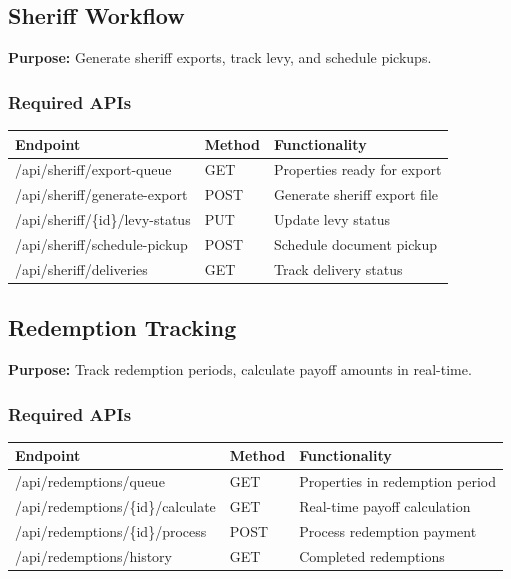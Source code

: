 \documentclass[11pt,a4paper]{article}
\begin{document}
\subsection{Sheriff Workflow}

\textbf{Purpose:} Generate sheriff exports, track levy, and schedule pickups.

\subsubsection{Required APIs}

\begin{longtable}{|p{5cm}|p{2cm}|p{6cm}|}
\hline
\textbf{Endpoint} & \textbf{Method} & \textbf{Functionality} \\
\hline
/api/sheriff/export-queue & GET & Properties ready for export \\
/api/sheriff/generate-export & POST & Generate sheriff export file \\
/api/sheriff/\{id\}/levy-status & PUT & Update levy status \\
/api/sheriff/schedule-pickup & POST & Schedule document pickup \\
/api/sheriff/deliveries & GET & Track delivery status \\
\hline
\end{longtable}

\subsection{Redemption Tracking}

\textbf{Purpose:} Track redemption periods, calculate payoff amounts in real-time.

\subsubsection{Required APIs}

\begin{longtable}{|p{5cm}|p{2cm}|p{6cm}|}
\hline
\textbf{Endpoint} & \textbf{Method} & \textbf{Functionality} \\
\hline
/api/redemptions/queue & GET & Properties in redemption period \\
/api/redemptions/\{id\}/calculate & GET & Real-time payoff calculation \\
/api/redemptions/\{id\}/process & POST & Process redemption payment \\
/api/redemptions/history & GET & Completed redemptions \\
\hline
\end{longtable}
\end{document}
